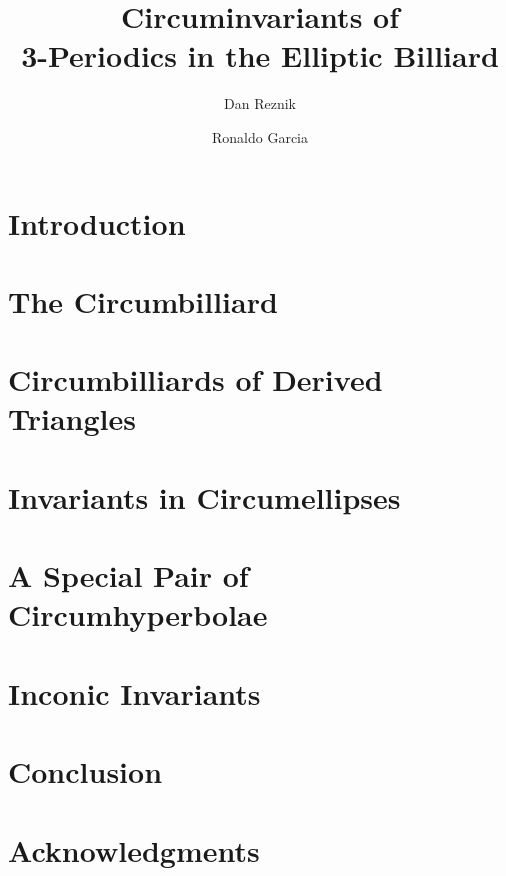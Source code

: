 \documentclass{amsart}
\title[Circuminvariants of 3-Periodics in the Elliptic Billiard]{Circuminvariants of\\ 3-Periodics in the Elliptic Billiard}
\author{Dan Reznik}
\author{Ronaldo Garcia}
\begin{document}
\maketitle


%

\section{Introduction}
\label{sec:intro}


%

\section{The Circumbilliard}
\label{sec:cb}


\section{Circumbilliards of Derived Triangles}
\label{sec:cb_derived}


\section{Invariants in Circumellipses}
\label{sec:circumellipses}


\section{A Special Pair of  Circumhyperbolae}
\label{sec:circumhyperbolae}


%

\section{Inconic Invariants}
\label{sec:inconic}


\section{Conclusion}
\label{sec:conclusion}


\section*{Acknowledgments}



 
%

\appendix

\end{document}
